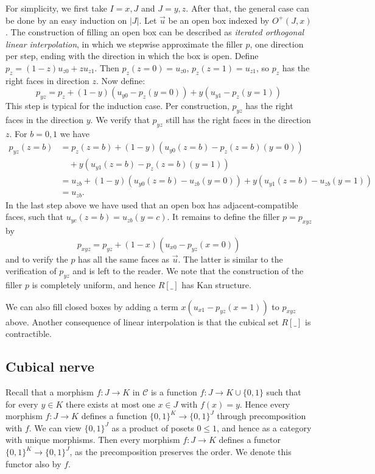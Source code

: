 \documentclass[a4paper,USenglish,draft]{lipics}
\newcommand{\CC}{{\mathcal C}}
\newcommand{\set}[1]{\{#1\}}
\begin{document}
For simplicity, we first take $I=x,J$ and $J=y,z$. After that, the
general case can be done by an easy induction on $|J|$.  Let $\vec u$
be an open box indexed by $O^+(J,x)$.  The construction of filling an
open box can be described as \emph{iterated orthogonal linear
  interpolation}, in which we stepwise approximate the filler $p$, one
direction per step, ending with the direction in which the box is
open. Define $p_z = (1-z) u_{z0} + z u_{z1}$.  Then $p_z (z=0) =
u_{z0}$, $p_z(z=1) = u_{z1}$, so $p_z$ has the right faces in
direction $z$.  Now define:
\[p_{yz} = p_z + (1-y) (u_{y0} - p_z(y=0)) + y (u_{y1} - p_z(y=1))\]
This step is typical for the induction case.
Per construction, $p_{yz}$ has the right faces in the direction $y$.
We verify that $p_{yz}$ still has the right faces in the direction $z$.
For $b=0,1$ we have
\begin{align*}
  p_{yz} (z=b)
  &= p_z(z=b) + (1-y) (u_{y0}(z=b) - p_z(z=b)(y=0)) \\
  &\quad + y (u_{y1}(z=b) - p_z(z=b)(y=1))\\
  &= u_{zb} + (1-y) (u_{y0}(z=b) -  u_{zb}(y=0)) + y (u_{y1}(z=b) -
  u_{zb}(y=1))\\
  &= u_{zb}.
\end{align*}
In the last step above we have used that an open box has
adjacent-compatible faces, such that $u_{yc}(z=b) = u_{zb}(y=c)$. It
remains to define the filler $p=p_{xyz}$ by
\[
p_{xyz} = p_{yz} + (1-x) (u_{x0} - p_{yz}(x=0))
\]
and to verify the $p$ has all the same faces as $\vec u$.  The latter
is similar to the verification of $p_{yz}$ and is left to the reader.
We note that the construction of the filler $p$ is completely uniform,
and hence $R[\_]$ has Kan structure.

We can also fill closed boxes by adding a term $x(u_{x1} -
p_{yz}(x=1))$ to $p_{xyz}$ above. Another consequence of linear
interpolation is that the cubical set $R[\_]$ is contractible.

\subsection{Cubical nerve}
\label{sec:cubical-nerve}

Recall that a morphism $f:J\to K$ in $\CC$ is a function $f:J\to
K\cup\set{0,1}$ such that for every $y\in K$ there exists at most one
$x\in J$ with $f(x)=y$.  Hence every morphism $f:J\to K$ defines a
function $\set{0,1}^K \to \set{0,1}^J$ through precomposition with
$f$.  We can view $\set{0,1}^J$ as a product of posets $0\leq1$, and
hence as a category with unique morphisms.  Then every morphism
$f:J\to K$ defines a functor $\set{0,1}^K \to \set{0,1}^J$, as the
precomposition preserves the order.  We denote this functor also by
$f$.
\end{document}

